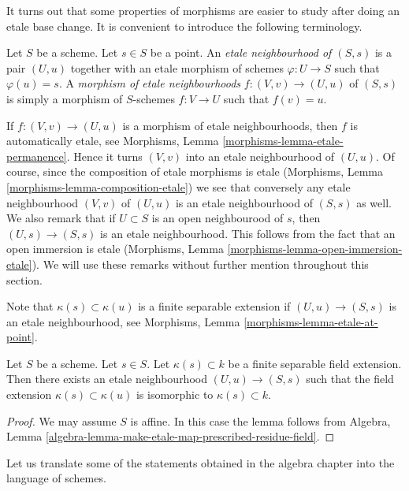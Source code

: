 \noindent
It turns out that some properties of morphisms are easier to study
after doing an etale base change. It is convenient to introduce the
following terminology.

\begin{definition}
\label{definition-etale-neighbourhood}
Let $S$ be a scheme. Let $s \in S$ be a point.
An {\it etale neighbourhood of $(S, s)$} is a
pair $(U, u)$ together with an etale morphism
of schemes $\varphi : U \to S$ such that $\varphi(u) = s$.
A {\it morphism of etale neighbourhoods} $f : (V, v) \to (U, u)$
of $(S, s)$ is simply a morphism of $S$-schemes $f : V \to U$ such
that $f(v) = u$.
\end{definition}

\noindent
If $f : (V, v) \to (U, u)$ is a morphism of etale
neighbourhoods, then $f$ is automatically etale, see
Morphisms, Lemma \ref{morphisms-lemma-etale-permanence}.
Hence it turns $(V, v)$ into an etale neighbourhood of
$(U, u)$. Of course, since the composition of etale morphisms
is etale (Morphisms, Lemma \ref{morphisms-lemma-composition-etale})
we see that conversely any etale neighbourhood $(V, v)$ of
$(U, u)$ is an etale neighbourhood of $(S, s)$ as well.
We also remark that if $U \subset S$ is an open neighbourood
of $s$, then $(U, s) \to (S, s)$ is an etale neighbourhood.
This follows from the fact that an open immersion is
etale (Morphisms, Lemma \ref{morphisms-lemma-open-immersion-etale}).
We will use these remarks without further mention throughout this
section.

\medskip\noindent
Note that $\kappa(s) \subset \kappa(u)$ is a finite separable extension
if $(U, u) \to (S, s)$ is an etale neighbourhood,
see Morphisms, Lemma \ref{morphisms-lemma-etale-at-point}.

\begin{lemma}
\label{lemma-realize-presecribed-residue-field-extension-etale}
Let $S$ be a scheme.
Let $s \in S$.
Let $\kappa(s) \subset k$ be a finite separable field extension.
Then there exists an etale neighbourhood $(U, u) \to (S, s)$
such that the field extension $\kappa(s) \subset \kappa(u)$ is
isomorphic to $\kappa(s) \subset k$.
\end{lemma}

\begin{proof}
We may assume $S$ is affine.
In this case the lemma follows from
Algebra, Lemma \ref{algebra-lemma-make-etale-map-prescribed-residue-field}.
\end{proof}

\noindent
Let us translate some of the statements obtained in the algebra chapter
into the language of schemes.

